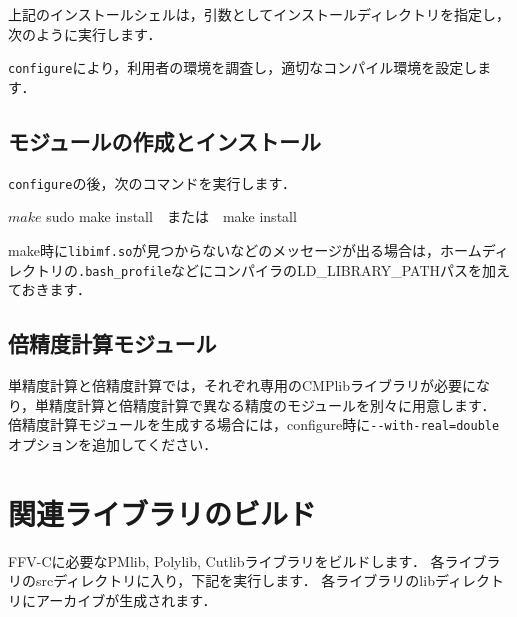 {\small
{}
}

上記のインストールシェルは，引数としてインストールディレクトリを指定し，次のように実行します．


\verb|configure|により，利用者の環境を調査し，適切なコンパイル環境を設定します．

{\small
{}
}

%
\subsection{モジュールの作成とインストール}
\verb|configure|の後，次のコマンドを実行します．

{\small
\begin{program}
$ make
$ sudo make install　または　make install
\end{program}
}

make時に\verb|libimf.so|が見つからないなどのメッセージが出る場合は，ホームディレクトリの\verb|.bash_profile|などにコンパイラのLD\_LIBRARY\_PATHパスを加えておきます．
{\small
{}
}


%
\subsection{倍精度計算モジュール}
単精度計算と倍精度計算では，それぞれ専用のCMPlibライブラリが必要になり，単精度計算と倍精度計算で異なる精度のモジュールを別々に用意します．
倍精度計算モジュールを生成する場合には，configure時に\verb|--with-real=double|オプションを追加してください．


%
\section{関連ライブラリのビルド}

FFV-Cに必要なPMlib, Polylib, Cutlibライブラリをビルドします．
各ライブラリのsrcディレクトリに入り，下記を実行します．
各ライブラリのlibディレクトリにアーカイブが生成されます．

